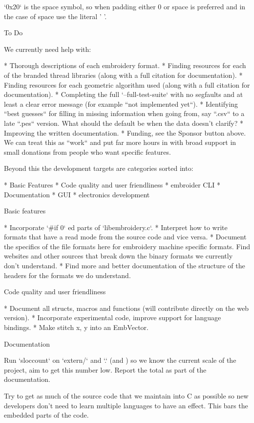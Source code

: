 \documentclass[a4paper]{report}
\begin{document}
`0x20` is the space symbol, so when padding either 0 or space is preferred and
in the case of space use the literal ' '.

To Do
~~~~~

We currently need help with:

* Thorough descriptions of each embroidery format.
* Finding resources for each of the branded thread libraries (along with a
  full citation for documentation).
* Finding resources for each geometric algorithm used (along with a full
  citation for documentation).
* Completing the full `--full-test-suite` with no segfaults and at least a
  clear error message (for example ``not implemented yet``).
* Identifying ``best guesses`` for filling in missing information when going
  from, say ``.csv`` to a late ``.pes`` version. What should the default be when
  the data doesn't clarify?
* Improving the written documentation.
* Funding, see the Sponsor button above. We can treat this as ``work`` and
  put far more hours in with broad support in small donations from people who want
  specific features.

Beyond this the development targets are categories sorted into:

* Basic Features
* Code quality and user friendliness
* embroider CLI
* Documentation
* GUI
* electronics development

Basic features
~~~~~~~~~~~~~~

* Incorporate `\#if 0` ed parts of `libembroidery.c`.
* Interpret how to write formats that have a read mode from the source
  code and vice versa.
* Document the specifics of the file formats here for embroidery machine
  specific formats. Find websites and other sources that break down the binary
  formats we currently don't understand.
* Find more and better documentation of the structure of the headers for the
  formats we do understand.

Code quality and user friendliness
~~~~~~~~~~~~~~~~~~~~~~~~~~~~~~~~~~

* Document all structs, macros and functions (will contribute directly
  on the web version).
* Incorporate experimental code, improve support for language bindings.
* Make stitch x, y into an EmbVector.

Documentation
~~~~~~~~~~~~~

Run `sloccount` on `extern/` and `.` (and ) so we know the
current scale of the project, aim to get this number low. Report the total as
part of the documentation.

Try to get as much of the source code that we maintain into C as possible so
new developers don't need to learn multiple languages to have an effect. This
bars the embedded parts of the code.
\end{document}

